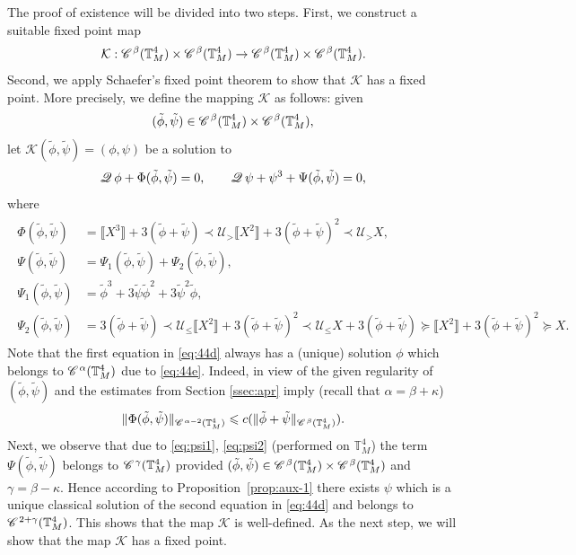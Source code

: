 \documentclass[a4paper,11pt]{article}
\renewcommand{\leq}{\leqslant}
\numberwithin{equation}{section}
\newcommand{\CC}{\mathscr{C} \hspace{.1em}}
\newcommand{\UU}{\mathscr{U}}
\newcommand{\Q}{\mathscr{Q} \hspace{.2em}}
\newcommand{\8}{\infty}
\begin{document}
The proof of existence will be divided into two steps. First, we construct a suitable fixed point map
$$\mathcal{K}:\CC^{\beta}(\mathbb{T}_{M}^{4})\times \CC^{\beta}(\mathbb{T}_{M}^{4})\to\CC^{\beta}(\mathbb{T}_{M}^{4})\times \CC^{\beta}(\mathbb{T}_{M}^{4}).$$
Second, we apply Schaefer's fixed point theorem \cite[Section 9.2.2, Theorem 4]{E98} to  show that $\mathcal{K}$ has a fixed point.
More precisely, we define the mapping $\mathcal{K}$ as follows: given
$$(\tilde\phi,\tilde\psi)\in \CC^{\beta}(\mathbb{T}_{M}^{4})\times \CC^{\beta}(\mathbb{T}_{M}^{4}),$$
let $\mathcal{K}(\tilde\phi,\tilde\psi)=(\phi,\psi)$ be a solution to 
\begin{equation}\label{eq:44d}
\Q \phi + \Phi(\tilde\phi,\tilde\psi) = 0, \qquad \Q \psi + \psi^3 + \Psi(\tilde\phi,\tilde\psi) = 0,
\end{equation}
where
\begin{align*}
\begin{aligned}
\Phi(\tilde\phi,\tilde\psi)&= \llbracket X^3 \rrbracket + 3 (\tilde\phi + \tilde\psi) \prec \UU_{>}
   \llbracket X^2 \rrbracket + 3 (\tilde\phi + \tilde\psi)^2 \prec \UU_{>} X,\\
\Psi(\tilde\phi,\tilde\psi)&= \Psi_1(\tilde\phi,\tilde\psi) + \Psi_2(\tilde\phi,\tilde\psi), \\
 \Psi_{1}(\tilde\phi,\tilde\psi)&=\tilde\phi^3 + 3 \tilde\psi \tilde\phi^2 + 3 \tilde\psi^2 \tilde\phi,\\
\Psi_{2}(\tilde\phi,\tilde\psi)&= 3 (\tilde\phi + \tilde\psi) \prec \UU_{\leqslant} \llbracket X^2
   \rrbracket + 3 (\tilde\phi + \tilde\psi)^2 \prec \UU_{\leqslant} X + 3 (\tilde\phi +
   \tilde\psi) \succcurlyeq \llbracket X^2 \rrbracket + 3 (\tilde\phi + \tilde\psi)^2
   \succcurlyeq X.
\end{aligned}
\end{align*}   
Note that the first equation in \eqref{eq:44d} always has a (unique) solution $\phi$ which belongs to $\CC^{\alpha}(\mathbb{T}_{M}^{4})$  due to \eqref{eq:44e}. Indeed, in view of the given regularity of $(\tilde\phi,\tilde\psi)$ and the estimates from Section \ref{ssec:apr} imply  (recall that $\alpha=\beta+\kappa$)
$$
\|\Phi(\tilde\phi,\tilde\psi)\|_{\CC^{\alpha-2}(\mathbb{T}_{M}^{4})}\leq c(\|\tilde\phi+\tilde\psi\|_{\CC^{\beta}(\mathbb{T}_{M}^{4})}).
$$
Next,  we observe that due to \eqref{eq:psi1}, \eqref{eq:psi2} (performed on $\mathbb{T}^{4}_{M}$) the term $\Psi(\tilde\phi,\tilde\psi)$ belongs to $\CC^{\gamma}(\mathbb{T}^{4}_{M})$ provided   $(\tilde\phi,\tilde\psi)\in \CC^{\beta}(\mathbb{T}^{4}_{M})\times \CC^{\beta} (\mathbb{T}^{4}_{M})$ and $\gamma=\beta-\kappa$. Hence according to Proposition~\ref{prop:aux-1} there exists $\psi$ which is a unique classical solution of the second equation in \eqref{eq:44d} and belongs to $\CC^{2+\gamma}(\mathbb{T}_{M}^{4})$. This shows that the map $\mathcal{K}$ is well-defined.
As the next step, we will show that the map $\mathcal{K}$ has a fixed point.
\end{document}

